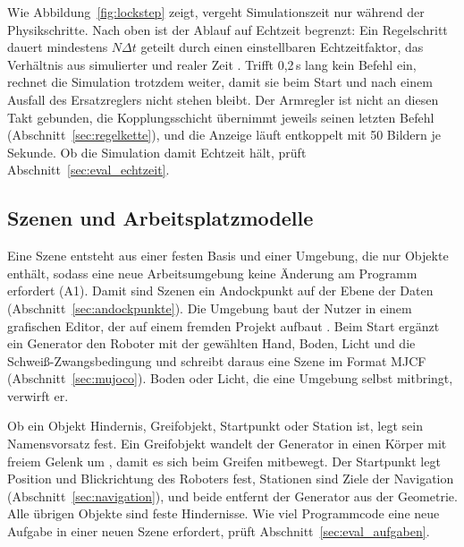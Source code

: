 Wie Abbildung~\ref{fig:lockstep} zeigt, vergeht Simulationszeit nur während der Physikschritte.
Nach oben ist der Ablauf auf Echtzeit begrenzt: Ein Regelschritt dauert mindestens $N \Delta t$ geteilt durch einen einstellbaren Echtzeitfaktor, das Verhältnis aus simulierter und realer Zeit \cite{Pitonakova2018}.
Trifft 0,2\,s lang kein Befehl ein, rechnet die Simulation trotzdem weiter, damit sie beim Start und nach einem Ausfall des Ersatzreglers nicht stehen bleibt.
Der Armregler ist nicht an diesen Takt gebunden, die Kopplungsschicht übernimmt jeweils seinen letzten Befehl (Abschnitt~\ref{sec:regelkette}), und die Anzeige läuft entkoppelt mit 50 Bildern je Sekunde.
Ob die Simulation damit Echtzeit hält, prüft Abschnitt~\ref{sec:eval_echtzeit}.

\subsection{Szenen und Arbeitsplatzmodelle}
\label{sec:szenen}
Eine Szene entsteht aus einer festen Basis und einer Umgebung, die nur Objekte enthält, sodass eine neue Arbeitsumgebung keine Änderung am Programm erfordert (A1).
Damit sind Szenen ein Andockpunkt auf der Ebene der Daten (Abschnitt~\ref{sec:andockpunkte}).
Die Umgebung baut der Nutzer in einem grafischen Editor, der auf einem fremden Projekt aufbaut .
Beim Start ergänzt ein Generator den Roboter mit der gewählten Hand, Boden, Licht und die Schweiß-Zwangsbedingung und schreibt daraus eine Szene im Format MJCF (Abschnitt~\ref{sec:mujoco}).
Boden oder Licht, die eine Umgebung selbst mitbringt, verwirft er.

Ob ein Objekt Hindernis, Greifobjekt, Startpunkt oder Station ist, legt sein Namensvorsatz fest.
Ein Greifobjekt wandelt der Generator in einen Körper mit freiem Gelenk um \cite{Todorov2012}, damit es sich beim Greifen mitbewegt.
Der Startpunkt legt Position und Blickrichtung des Roboters fest, Stationen sind Ziele der Navigation (Abschnitt~\ref{sec:navigation}), und beide entfernt der Generator aus der Geometrie.
Alle übrigen Objekte sind feste Hindernisse.
Wie viel Programmcode eine neue Aufgabe in einer neuen Szene erfordert, prüft Abschnitt~\ref{sec:eval_aufgaben}.

